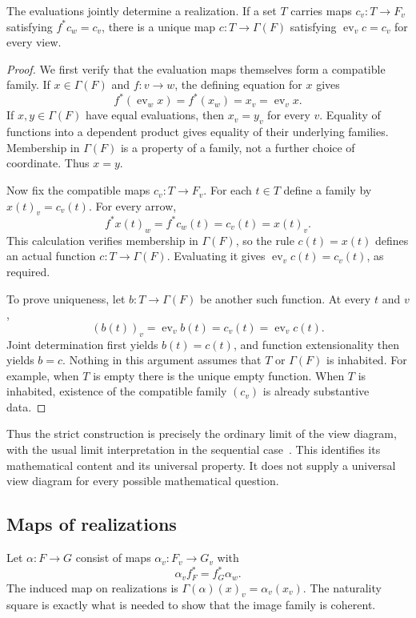 \begin{theorem}\label{KS01}
The evaluations jointly determine a realization. If a set \(T\) carries maps \(c_v:T\to F_v\) satisfying \(f^*c_w=c_v\), there is a unique map \(c:T\to\Gamma(F)\) satisfying \(\operatorname{ev}_v c=c_v\) for every view.
\end{theorem}
\begin{proof}
We first verify that the evaluation maps themselves form a compatible family. If $x\in\Gamma(F)$ and $f:v\to w$, the defining equation for $x$ gives
\[
 f^*(\operatorname{ev}_w x)=f^*(x_w)=x_v=\operatorname{ev}_v x.
\]
If $x,y\in\Gamma(F)$ have equal evaluations, then $x_v=y_v$ for every $v$. Equality of functions into a dependent product gives equality of their underlying families. Membership in $\Gamma(F)$ is a property of a family, not a further choice of coordinate. Thus $x=y$.

Now fix the compatible maps $c_v:T\to F_v$. For each $t\in T$ define a family by $x(t)_v=c_v(t)$. For every arrow,
\[
 f^*x(t)_w=f^*c_w(t)=c_v(t)=x(t)_v.
\]
This calculation verifies membership in $\Gamma(F)$, so the rule $c(t)=x(t)$ defines an actual function $c:T\to\Gamma(F)$. Evaluating it gives $\operatorname{ev}_vc(t)=c_v(t)$, as required.

To prove uniqueness, let $b:T\to\Gamma(F)$ be another such function. At every $t$ and $v$,
\[
 (b(t))_v=\operatorname{ev}_v b(t)=c_v(t)=\operatorname{ev}_v c(t).
\]
Joint determination first yields $b(t)=c(t)$, and function extensionality then yields $b=c$. Nothing in this argument assumes that $T$ or $\Gamma(F)$ is inhabited. For example, when $T$ is empty there is the unique empty function. When $T$ is inhabited, existence of the compatible family $(c_v)$ is already substantive data.
\end{proof}
Thus the strict construction is precisely the ordinary limit of the view diagram, with the usual limit interpretation in the sequential case~\cite{stacks-limits}. This identifies its mathematical content and its universal property. It does not supply a universal view diagram for every possible mathematical question.


\subsection{Maps of realizations}
Let \(\alpha:F\to G\) consist of maps \(\alpha_v:F_v\to G_v\) with
\[
 \alpha_v f_F^*=f_G^*\alpha_w.
\]
The induced map on realizations is \(\Gamma(\alpha)(x)_v=\alpha_v(x_v)\). The naturality square is exactly what is needed to show that the image family is coherent.


